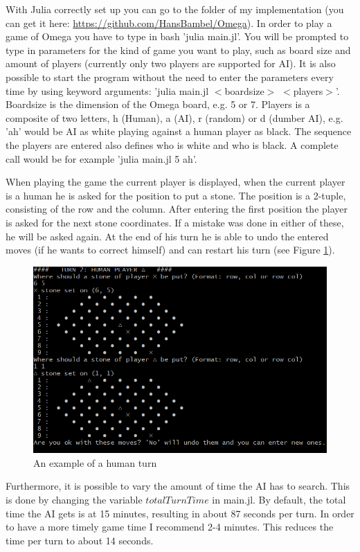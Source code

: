 \documentclass[a4paper]{article}
\begin{document}
With Julia correctly set up you can go to the folder of my implementation (you can get it here: \url{https://github.com/HansBambel/Omega}). In order to play a game of Omega you have to type in bash 'julia main.jl'. You will be prompted to type in parameters for the kind of game you want to play, such as board size and amount of players (currently only two players are supported for AI). It is also possible to start the program without the need to enter the parameters every time by using keyword arguments: 'julia main.jl $<$boardsize$>$ $<$players$>$'. Boardsize is the dimension of the Omega board, e.g. 5 or 7. Players is a composite of two letters, h (Human), a (AI), r (random) or d (dumber AI), e.g. 'ah' would be AI as white playing against a human player as black. The sequence the players are entered also defines who is white and who is black. A complete call would be for example 'julia main.jl 5 ah'.

When playing the game the current player is displayed, when the current player is a human he is asked for the position to put a stone. The position is a 2-tuple, consisting of the row and the column. After entering the first position the player is asked for the next stone coordinates. If a mistake was done in either of these, he will be asked again. At the end of his turn he is able to undo the entered moves (if he wants to correct himself) and can restart his turn (see Figure \ref{humanTurn}).

\begin{figure}
\includegraphics[scale=0.6]{"Human turn"}
\caption{An example of a human turn}
\label{humanTurn}
\end{figure}


Furthermore, it is possible to vary the amount of time the AI has to search. This is done by changing the variable $totalTurnTime$ in main.jl. By default, the total time the AI gets is at 15 minutes, resulting in about 87 seconds per turn. In order to have a more timely game time I recommend 2-4 minutes. This reduces the time per turn to about 14 seconds.
\end{document}
